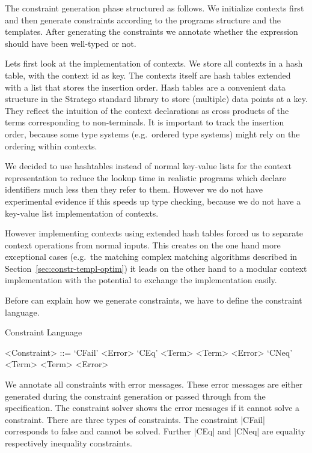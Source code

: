 The constraint generation phase structured as follows. We initialize
contexts first and then generate constraints according to the programs
structure and the templates. After generating the constraints we
annotate whether the expression should have been well-typed or not.

Lets first look at the implementation of contexts. We store all
contexts in a hash table, with the context id as key. The contexts
itself are hash tables extended with a list that stores the insertion
order. Hash tables are a convenient data structure in the Stratego
standard library to store (multiple) data points at a key. They
reflect the intuition of the context declarations as cross products of
the terms corresponding to non-terminals. It is important to track the
insertion order, because some type systems (e.g.\ ordered type
systems) might rely on the ordering within contexts.

We decided to use hashtables instead of normal key-value lists for the
context representation to reduce the lookup time in realistic programs
which declare identifiers much less then they refer to them. However
we do not have experimental evidence if this speeds up type checking,
because we do not have a key-value list implementation of contexts.

However implementing contexts using extended hash tables forced us to
separate context operations from normal inputs. This creates on the
one hand more exceptional cases (e.g.\ the matching complex matching
algorithms described in Section~\ref{sec:constr-templ-optim}) it leads
on the other hand to a modular context implementation with the
potential to exchange the implementation easily.

Before can explain how we generate constraints, we have to define the
constraint language.

\begin{definition}{Constraint Language}
  \begin{grammar}
    <Constraint> ::= `CFail' <Error>
    \alt `CEq' <Term> <Term> <Error>
    \alt `CNeq' <Term> <Term> <Error>
  \end{grammar}
\end{definition}

We annotate all constraints with error messages. These error messages
are either generated during the constraint generation or passed
through from the specification. The constraint solver shows the error
messages if it cannot solve a constraint. There are three types of
constraints. The constraint \code|CFail| corresponds to false and
cannot be solved. Further \code|CEq| and \code|CNeq| are equality
respectively inequality constraints.

